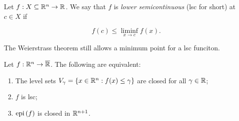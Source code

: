 \begin{definition}

    Let $f : X \subseteq {\mathbb{R}^n} \to \mathbb{R}$. We say that $f$ is \emph{lower semicontinuous} (lsc for short) at $c \in X$ if 

    \[ f(c) \le \liminf_{x \to c} f(x). \]
    
\end{definition}

\begin{theorem}[Weierstrass]
    
    The Weierstrass theorem still allows a minimum point for a lsc funciton.

\end{theorem}

\begin{proposition}[Book 1.1.2]
    
    Let $f : {\mathbb{R}^n} \to \overline{\mathbb{R}}$. The following are equivalent: 

    \begin{enumerate}
        \item[$i)$] The level sets $V_\gamma = \left\{ x \in {\mathbb{R}^n} : f(x) \le \gamma \right\}$ are closed for all $\gamma \in \mathbb{R}$;
        \item[$ii)$] $f$ is lsc;
        \item[$iii)$] $\mathrm{epi}\left(f\right)$ is closed in ${\mathbb{R}^{n+1}}$.
    \end{enumerate}

\end{proposition}

